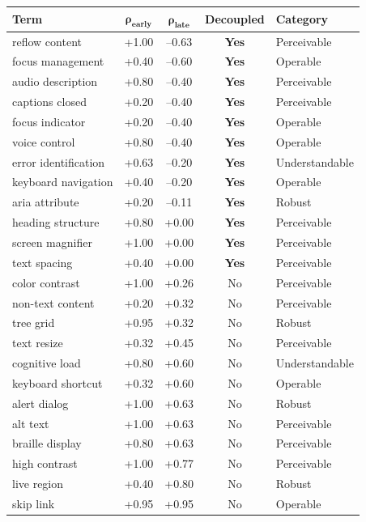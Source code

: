 \documentclass[10pt]{article} %
\begin{document}
\begin{table}[H]
\centering
\scriptsize
\begin{tabular}{|l|c|c|c|l|}
\hline
\textbf{Term} & $\mathbf{\rho_\text{early}}$ & $\mathbf{\rho_\text{late}}$ & \textbf{Decoupled} & \textbf{Category} \\
\hline
reflow content & +1.00 & --0.63 & \textbf{Yes} & Perceivable \\
focus management & +0.40 & --0.60 & \textbf{Yes} & Operable \\
audio description & +0.80 & --0.40 & \textbf{Yes} & Perceivable \\
captions closed & +0.20 & --0.40 & \textbf{Yes} & Perceivable \\
focus indicator & +0.20 & --0.40 & \textbf{Yes} & Operable \\
voice control & +0.80 & --0.40 & \textbf{Yes} & Operable \\
error identification & +0.63 & --0.20 & \textbf{Yes} & Understandable \\
keyboard navigation & +0.40 & --0.20 & \textbf{Yes} & Operable \\
aria attribute & +0.20 & --0.11 & \textbf{Yes} & Robust \\
heading structure & +0.80 & +0.00 & \textbf{Yes} & Perceivable \\
screen magnifier & +1.00 & +0.00 & \textbf{Yes} & Perceivable \\
text spacing & +0.40 & +0.00 & \textbf{Yes} & Perceivable \\
color contrast & +1.00 & +0.26 & No & Perceivable \\
non-text content & +0.20 & +0.32 & No & Perceivable \\
tree grid & +0.95 & +0.32 & No & Robust \\
text resize & +0.32 & +0.45 & No & Perceivable \\
cognitive load & +0.80 & +0.60 & No & Understandable \\
keyboard shortcut & +0.32 & +0.60 & No & Operable \\
alert dialog & +1.00 & +0.63 & No & Robust \\
alt text & +1.00 & +0.63 & No & Perceivable \\
braille display & +0.80 & +0.63 & No & Perceivable \\
high contrast & +1.00 & +0.77 & No & Perceivable \\
live region & +0.40 & +0.80 & No & Robust \\
skip link & +0.95 & +0.95 & No & Operable \\

\end{tabular}
\end{table}
\end{document}
